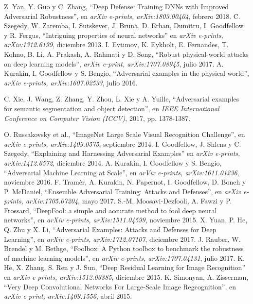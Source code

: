 \documentclass[conference]{IEEEtran}
\begin{document}
\begin{thebibliography}{1}
Z. Yan, Y. Guo y C. Zhang, “Deep Defense: Training DNNs with Improved Adversarial Robustness”, en  \textit{arXiv e-prints, arXiv:1803.00404}, febrero 2018.
C. Szegedy, W. Zaremba, I. Sutskever, J. Bruna, D. Erhan, Dumitru, I. Goodfellow y R. Fergus, “Intriguing properties of neural networks” en \textit{arXiv e-prints, arXiv:1312.6199}, diciembre 2013.
I. Evtimov, K. Eykholt, E. Fernandes, T. Kohno, B. Li, A. Prakash, A. Rahmati y D. Song, “Robust physical-world attacks on deep learning models”, \textit{arXiv e-print, arXiv:1707.08945}, julio 2017.
A. Kurakin, I. Goodfellow y S. Bengio, “Adversarial examples in the physical world”, \textit{arXiv e-prints, arXiv:1607.02533}, julio 2016.

C. Xie, J. Wang, Z. Zhang, Y. Zhou, L. Xie y A. Yuille, “Adversarial examples for semantic segmentation and object detection”, en \textit{IEEE International Conference on Computer Vision (ICCV)}, 2017, pp. 1378-1387.

O. Russakovsky et al., ``ImageNet Large Scale Visual Recognition Challenge'', en \textit{arXiv e-prints, arXiv:1409.0575}, septiembre 2014.
I. Goodfellow, J. Shlens y C. Szegedy, “Explaining and Harnessing Adversarial Examples” en \textit{arXiv e-prints, arXiv:1412.6572}, diciembre 2014.
A. Kurakin, I. Goodfellow y S. Bengio, ``Adversarial Machine Learning at Scale'', en \textit{arVix e-prints, arXiv:1611.01236}, noviembre 2016.
F. Tramèr, A. Kurakin, N. Papernot, I. Goodfellow, D. Boneh y P. McDaniel, ``Ensemble Adversarial Training: Attacks and Defenses'', en \textit{arXiv e-prints, arXiv:1705.07204}, mayo 2017.
S.-M. Moosavi-Dezfooli, A. Fawzi y P. Frossard, “DeepFool: a simple and accurate method to fool deep neural networks”, en  \textit{arXiv e-prints, arXiv:1511.04599}, noviembre 2015.
X. Yuan, P. He, Q. Zhu y X. Li, “Adversarial Examples: Attacks and Defenses for Deep Learning”, en \textit{arXiv e-prints, arXiv:1712.07107}, diciembre 2017.
J. Rauber, W. Brendel y M. Bethge, “Foolbox: A Python toolbox to benchmark the robustness of machine learning models”, en \textit{arXiv e-prints, arXiv:1707.04131}, julio 2017.
K. He, X. Zhang, S. Ren y J. Sun, ``Deep Residual Learning for Image Recognition'' en \textit{arXiv e-prints, arXiv:1512.03385}, diciembre 2015.
K. Simonyan,  A. Zisserman, ``Very Deep Convolutional
Networks For Large-Scale Image Regcognition'', en \textit{arXiv e-print, arXiv:1409.1556}, abril 2015.
\end{thebibliography}
\end{document}
